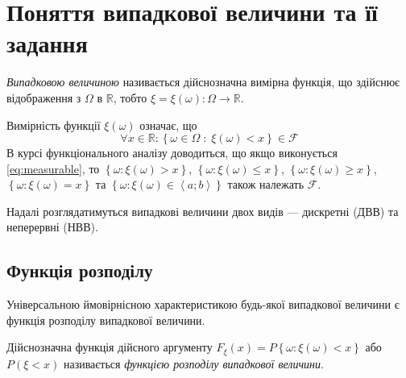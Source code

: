
\section{Поняття випадкової величини та її задання}
\begin{definition}
    \emph{Випадковою величиною} називається дійснозначна вимірна функція, що здійснює 
    відображення з $\Omega$ в $\mathbb{R}$, тобто $\xi = \xi(\omega): \Omega 
    \rightarrow \mathbb{R}$.
\end{definition}
\begin{remark}
    Вимірність функції $\xi(\omega)$ означає, що 
    \begin{equation}\label{eq:measurable}
        \forall x \in \mathbb{R}: 
        \left\{ \omega \in \Omega\; :\; \xi(\omega) < x\right\} \in \mathcal{F}
    \end{equation} В курсі 
    функціонального аналізу доводиться, що якщо виконується \eqref{eq:measurable}, то
    $\left\{ \omega: \xi(\omega) > x\right\}$, $\left\{ \omega: \xi(\omega) \leq x\right\}$,
    $\left\{ \omega: \xi(\omega) \geq x\right\}$, $\left\{ \omega: \xi(\omega) = x\right\}$ та
    $\left\{ \omega: \xi(\omega) \in \left< a; b\right> \right\}$ також належать $\mathcal{F}$.
\end{remark}

Надалі розглядатимуться випадкові величини двох видів --- дискретні (ДВВ) та неперервні (НВВ).

\subsection{Функція розподілу}

Універсальною ймовірнісною характеристикою будь-якої випадкової величини є функція 
розподілу випадкової величини.

\begin{definition}
    Дійснозначна функція дійсного аргументу $ F_\xi (x) = 
    P\left\{\omega:\xi(\omega) < x\right\}$ або 
    $P\left(\xi < x\right)$ називається \emph{функцією розподілу випадкової величини}.
\end{definition}

